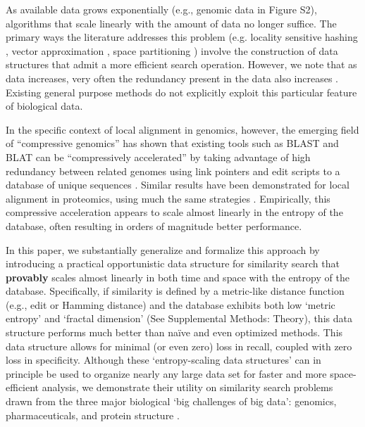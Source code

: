 \documentclass[review,preprint,12pt]{elsarticle}
\renewcommand{\cite}{\citep} %
\theoremstyle{definition}
\theoremstyle{remark}
\numberwithin{equation}{section}
\begin{document}
As available data grows exponentially \cite{berger2013computational,yu2015quality} (e.g., genomic data in Figure S2), 
algorithms that scale linearly with the amount of data no longer suffice.
The primary ways the literature addresses this problem (e.g.
locality sensitive hashing \cite{indyk1998approximate}, vector approximation \cite{ferhatosmanoglu2000vector}, space partitioning \cite{weber1998quantitative}) involve the construction of data structures that admit a more efficient search operation.
However, we note that as data increases, very often the redundancy present in the data also increases \cite{loh2012compressive}.
Existing general purpose methods do not explicitly exploit this particular feature of biological data.

In the specific context of local alignment in genomics, however, the emerging field of ``compressive genomics'' has shown that existing tools such as BLAST and BLAT can be ``compressively accelerated'' by taking advantage of high redundancy between related genomes using link pointers and edit scripts to a database of unique sequences \cite{loh2012compressive}.
Similar results have been demonstrated for local alignment in proteomics, using much the same strategies \cite{daniels2013compressive}.
Empirically, this compressive acceleration appears to scale almost linearly in the entropy of the database, often resulting in orders of magnitude better performance.

In this paper, we substantially generalize and formalize this approach by introducing a practical opportunistic data structure for similarity search that \textbf{provably} scales almost linearly in both time and space with the entropy of the database.
Specifically, if similarity is defined by a metric-like distance function (e.g., edit or Hamming distance) and the database exhibits both low `metric entropy' and `fractal dimension' (See Supplemental Methods: Theory), this data structure performs much better than na\"ive and even optimized methods.
This data structure allows for minimal (or even zero) loss in recall, coupled
with zero loss in specificity.
Although these `entropy-scaling data structures' can in principle be used to organize nearly any large data set for faster and more space-efficient analysis,
we demonstrate their utility on similarity search problems drawn from the three major biological `big challenges of big data': genomics, pharmaceuticals, and protein structure \cite{marx2013biology}.
\end{document}
